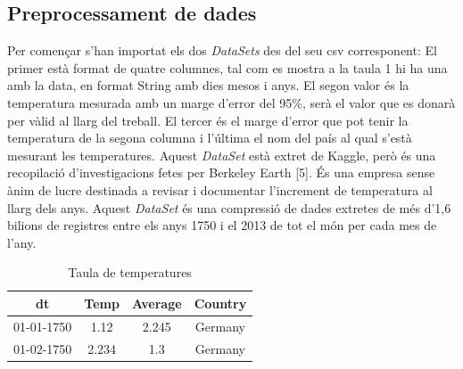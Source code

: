 \documentclass[10pt,a4paper,twocolumn,twoside]{article}
\begin{document}
\subsection{Preprocessament de dades}
Per començar s'han importat els dos \textit{DataSets} des del seu csv corresponent:
El primer està format de quatre columnes, tal com es mostra a la taula 1 hi ha una amb la data, en format String amb dies mesos i anys. El segon valor és la temperatura mesurada amb un marge d'error del 95\%, serà el valor que es donarà per vàlid al llarg del treball. El tercer és el marge d'error que pot tenir la temperatura de la segona columna i l'última el nom del país al qual s'està mesurant les temperatures. Aquest \textit{DataSet} està extret de Kaggle, però és una recopilació d'investigacions fetes per Berkeley Earth [5]. És una empresa sense ànim de lucre destinada a revisar i documentar l'increment de temperatura al llarg dels anys. Aquest \textit{DataSet} és una compressió de dades extretes de més d'1,6 bilions de registres entre els anys 1750 i el 2013 de tot el món per cada mes de l'any.
\begin{table}[ht]
\caption{Taula de temperatures}
\begin{center}
\begin{tabular}{c c c c} %
\hline\hline %
dt & Temp & Average & Country \\
\hline
01-01-1750 & 1.12 & 2.245 & Germany \\
01-02-1750 & 2.234 & 1.3 & Germany \\
\hline
\end{tabular}
\end{center}
\end{table}
\end{document}
